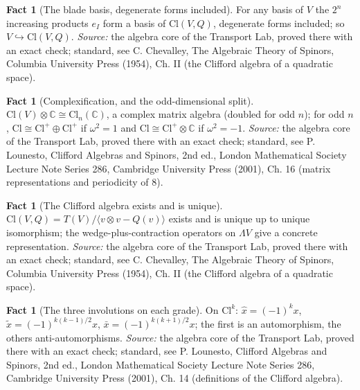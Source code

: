 \documentclass[11pt]{article}
\theoremstyle{definition}
\newtheorem{fact}[theorem]{Fact}
\theoremstyle{plain}
\providecommand{\C}{}\renewcommand{\C}{\mathbb{C}}
\providecommand{\Cl}{}\renewcommand{\Cl}{\mathrm{Cl}}
\begin{document}
\begin{fact}[The blade basis, degenerate forms included]\label{c:std-algebra.blade-basis}
For any basis of $V$ the $2^{n}$ increasing products $e_I$ form a basis of $\Cl(V, Q)$, degenerate forms included; so $V \hookrightarrow \Cl(V, Q)$.
\emph{Source:} the algebra core of the Transport Lab, proved there with an exact check; standard, see C. Chevalley, The Algebraic Theory of Spinors, Columbia University Press (1954), Ch. II (the Clifford algebra of a quadratic space).
\end{fact}

\begin{fact}[Complexification, and the odd-dimensional split]\label{c:std-algebra.complexification}
$\Cl(V) \otimes \C \cong \Cl_n(\C)$, a complex matrix algebra (doubled for odd $n$); for odd $n$, $\Cl \cong \Cl^{+} \oplus \Cl^{+}$ if $\omega^{2} = 1$ and $\Cl \cong \Cl^{+} \otimes \C$ if $\omega^{2} = -1$.
\emph{Source:} the algebra core of the Transport Lab, proved there with an exact check; standard, see P. Lounesto, Clifford Algebras and Spinors, 2nd ed., London Mathematical Society Lecture Note Series 286, Cambridge University Press (2001), Ch. 16 (matrix representations and periodicity of 8).
\end{fact}

\begin{fact}[The Clifford algebra exists and is unique]\label{c:std-algebra.existence-uniqueness}
$\Cl(V, Q) = T(V)/\langle v \otimes v - Q(v) \rangle$ exists and is unique up to unique isomorphism; the wedge-plus-contraction operators on $\Lambda V$ give a concrete representation.
\emph{Source:} the algebra core of the Transport Lab, proved there with an exact check; standard, see C. Chevalley, The Algebraic Theory of Spinors, Columbia University Press (1954), Ch. II (the Clifford algebra of a quadratic space).
\end{fact}

\begin{fact}[The three involutions on each grade]\label{c:std-algebra.involution-properties}
On $\Cl^{k}$: $\hat{x} = (-1)^{k}x$, $\tilde{x} = (-1)^{k(k-1)/2}x$, $\bar{x} = (-1)^{k(k+1)/2}x$; the first is an automorphism, the others anti-automorphisms.
\emph{Source:} the algebra core of the Transport Lab, proved there with an exact check; standard, see P. Lounesto, Clifford Algebras and Spinors, 2nd ed., London Mathematical Society Lecture Note Series 286, Cambridge University Press (2001), Ch. 14 (definitions of the Clifford algebra).
\end{fact}
\end{document}
